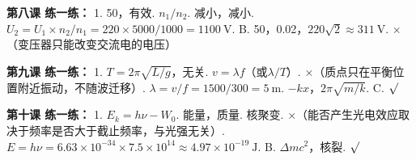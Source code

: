 \documentclass[a4paper,12pt]{ctexart}
\begin{document}
\textbf{第八课 练一练：}
1. 50，有效. $n_1/n_2$. 减小，减小. $U_2=U_1\times n_2/n_1=220\times5000/1000=1100\ \text{V}$. B. 50，0.02，$220\sqrt{2}\approx311\ \text{V}$. ×（变压器只能改变交流电的电压）

\textbf{第九课 练一练：}
1. $T=2\pi\sqrt{L/g}$，无关. $v=\lambda f$（或$\lambda/T$）. ×（质点只在平衡位置附近振动，不随波迁移）. $\lambda=v/f=1500/300=5\ \text{m}$. $-kx$，$2\pi\sqrt{m/k}$. C. $\surd$

\textbf{第十课 练一练：}
1. $E_k=h\nu-W_0$. 能量，质量. 核聚变. ×（能否产生光电效应取决于频率是否大于截止频率，与光强无关）. $E=h\nu=6.63\times10^{-34}\times7.5\times10^{14}\approx4.97\times10^{-19}\ \text{J}$. B. $\Delta mc^2$，核裂. $\surd$
\end{document}
